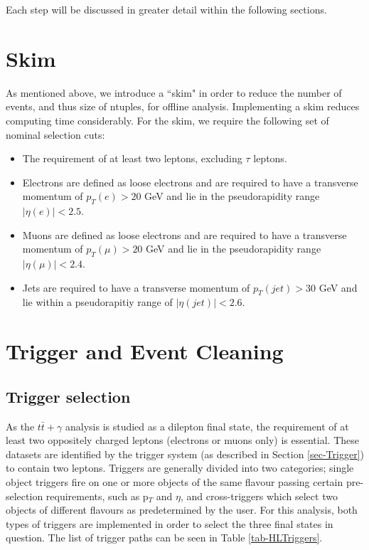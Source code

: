Each step will be discussed in greater detail within the following sections. 

\section{Skim}

As mentioned above, we introduce a ``skim" in order to reduce the number of events, and thus size of ntuples, for offline analysis. Implementing a skim reduces computing time considerably. For the skim, we require the following set of nominal selection cuts:

\begin{itemize}
	\item The requirement of at least two leptons, excluding $\tau$ leptons.
	\item Electrons are defined as loose electrons and are required to have a transverse momentum of $p_T(e) > 20$ GeV and lie in the pseudorapidity range $|\eta(e)| < 2.5$.
	\item Muons are defined as loose electrons and are required to have a transverse momentum of $p_T(\mu) > 20$ GeV and lie in the pseudorapidity range $|\eta(\mu)| < 2.4$.
	\item Jets are required to have a transverse momentum of $p_T(jet) > 30$ GeV and lie within a pseudorapitiy range of $|\eta(jet)| < 2.6$.
\end{itemize}

\section{Trigger and Event Cleaning} \label{sec-TriggerAndEventCleaning}

\subsection{Trigger selection}

As the $t\bar{t}+\gamma$ analysis is studied as a dilepton final state, the requirement of at least two oppositely charged leptons (electrons or muons only) is essential. These datasets are identified by the trigger system (as described in Section \ref{sec-Trigger}) to contain two leptons. Triggers are generally divided into two categories; single object triggers fire on one or more objects of the same flavour passing certain pre-selection requirements, such as p$_T$ and $\eta$, and cross-triggers which select two objects of different flavours as predetermined by the user. For this analysis, both types of triggers are implemented in order to select the three final states in question. The list of trigger paths can be seen in Table \ref{tab-HLTriggers}. 

